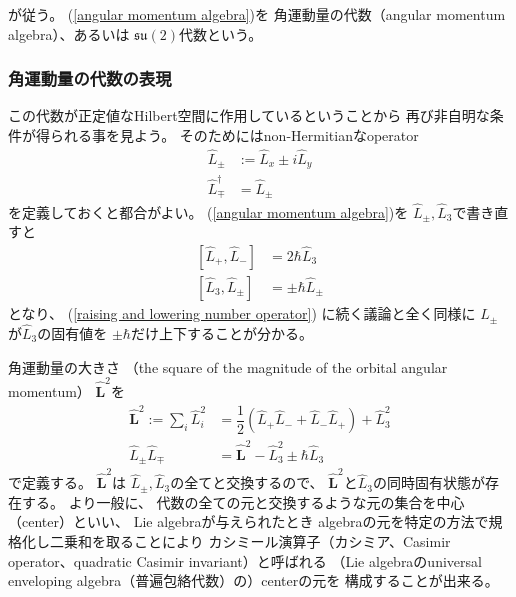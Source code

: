が従う。
(\ref{angular momentum algebra})を
角運動量の代数（angular momentum algebra）、あるいは
$\mathfrak{su}(2)$代数という。

\subsubsection{角運動量の代数の表現}

この代数が正定値なHilbert空間に作用しているということから
再び非自明な条件が得られる事を見よう。
そのためにはnon-Hermitianなoperator
\begin{align}
    \hat{L}_\pm
    &:=
    \hat{L}_x
    \pm
    i \hat{L}_y
\\
    \hat{L}_\mp^\dagger
    &=
    \hat{L}_\pm
\end{align}
を定義しておくと都合がよい。
(\ref{angular momentum algebra})を
$\hat{L}_\pm, \hat{L}_3$で書き直すと
\begin{subequations}
\begin{align}
    [\hat{L}_+, \hat{L}_-]
    &= 2 \hbar \hat{L}_3
\\
    [\hat{L}_3, \hat{L}_\pm]
    &= \pm \hbar \hat{L}_\pm
\label{angular momentum creation annihilation}
\end{align}
\label{angular momentum algebra with L_pm}
\end{subequations}
となり、
(\ref{raising and lowering number operator})
に続く議論と全く同様に
$\hat{L}_\pm$が$\hat{L}_3$の固有値を
$\pm \hbar$だけ上下することが分かる。

角運動量の大きさ
（the square of the magnitude of the orbital angular momentum）
$\hat{\bm{L}}^2$を
\begin{align}
    \hat{\bm{L}}^2
    := \sum_i \hat{L}_i^2
&=
    \dfrac{1}{2}
    \left(
        \hat{L}_+ \hat{L}_-
    +
        \hat{L}_- \hat{L}_+
    \right)
    +
    \hat{L}_3^2
\label{the square of the magnitude of the orbital angular momentum}
\\
    \hat{L}_\pm \hat{L}_\mp
    &=
    \hat{\bm{L}}^2 - \hat{L}_3^2
    \pm \hbar \hat{L}_3
\label{angular momentum raising lowering into l^2 and l_3}
\end{align}
で定義する。
$\hat{\bm{L}}^2$は
$\hat{L}_\pm, \hat{L}_3$の全てと交換するので、
$\hat{\bm{L}}^2$と$\hat{L}_3$の同時固有状態が存在する。
より一般に、
代数の全ての元と交換するような元の集合を中心（center）といい、
Lie algebraが与えられたとき
algebraの元を特定の方法で規格化し二乗和を取ることにより
カシミール演算子（カシミア、Casimir operator、quadratic Casimir invariant）と呼ばれる
（Lie algebraのuniversal enveloping algebra（普遍包絡代数）の）centerの元を
構成することが出来る。


